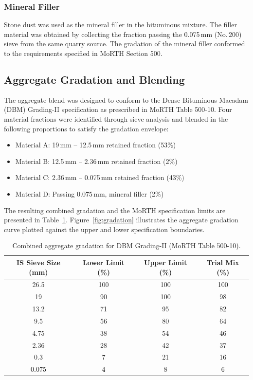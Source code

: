\documentclass[12pt,a4paper]{article}
\begin{document}
\subsubsection{Mineral Filler}

Stone dust was used as the mineral filler in the bituminous mixture. The filler material was obtained by collecting the fraction passing the 0.075\,mm (No.\,200) sieve from the same quarry source. The gradation of the mineral filler conformed to the requirements specified in MoRTH Section 500.

\subsection{Aggregate Gradation and Blending}
\label{subsec:agg_gradation}

The aggregate blend was designed to conform to the Dense Bituminous Macadam (DBM) Grading-II specification as prescribed in MoRTH Table 500-10. Four material fractions were identified through sieve analysis and blended in the following proportions to satisfy the gradation envelope:

\begin{itemize}
    \item Material A: 19\,mm -- 12.5\,mm retained fraction (53\%)
    \item Material B: 12.5\,mm -- 2.36\,mm retained fraction (2\%)
    \item Material C: 2.36\,mm -- 0.075\,mm retained fraction (43\%)
    \item Material D: Passing 0.075\,mm, mineral filler (2\%)
\end{itemize}

The resulting combined gradation and the MoRTH specification limits are presented in Table~\ref{tab:gradation}. Figure~\ref{fig:gradation} illustrates the aggregate gradation curve plotted against the upper and lower specification boundaries.

\begin{table}[htbp]
    \centering
    \caption{Combined aggregate gradation for DBM Grading-II (MoRTH Table 500-10).}
    \label{tab:gradation}
    \begin{tabular}{@{}cccc@{}}
        \toprule
        \textbf{IS Sieve Size (mm)} & \textbf{Lower Limit (\%)} & \textbf{Upper Limit (\%)} & \textbf{Trial Mix (\%)} \\
        \midrule
        26.5  & 100 & 100 & 100 \\
        19    & 90  & 100 & 98  \\
        13.2  & 71  & 95  & 82  \\
        9.5   & 56  & 80  & 64  \\
        4.75  & 38  & 54  & 46  \\
        2.36  & 28  & 42  & 37  \\
        0.3   & 7   & 21  & 16  \\
        0.075 & 4   & 8   & 6   \\
        \bottomrule
    \end{tabular}
\end{table}
\end{document}
